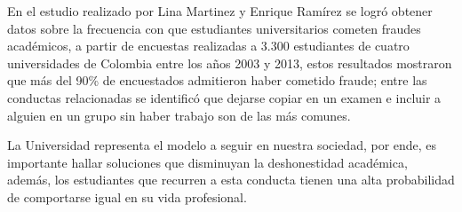 \documentclass[../Main.tex]{subfiles}
\begin{document}
\begin{justify}
En el estudio realizado por  Lina Martinez y Enrique Ramírez \cite{4} se logró obtener datos sobre la frecuencia con que estudiantes universitarios cometen fraudes académicos, a partir de encuestas realizadas a 3.300 estudiantes de cuatro universidades de Colombia entre los años 2003 y 2013, estos resultados mostraron que más del 90\% de encuestados admitieron haber cometido fraude; entre las conductas relacionadas se identificó que dejarse copiar en un examen e incluir a alguien en un grupo sin haber trabajo son de las más comunes.
\end{justify}\par

\begin{justify}
La Universidad representa el modelo a seguir en nuestra sociedad, por ende, es importante hallar soluciones que disminuyan la deshonestidad académica, además, los estudiantes que recurren a esta conducta tienen una alta probabilidad de comportarse igual en su vida profesional.
\end{justify}\par
\end{document}
